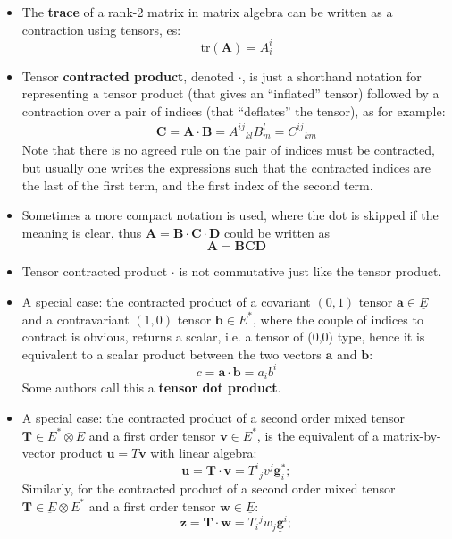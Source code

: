 \documentclass{digitaldynamics}
\def\vect#1{\bm{#1}}
\def\vcovar#1{{\bm{#1}}^*}
\def\vcontr#1{\underline{\bm{#1}}}
\def\tensor#1{\bm{#1}}
\def\matr#1{{#1}}
\begin{document}
\begin{itemize}
	\item The \textbf{trace} of a rank-2 matrix in matrix algebra can be written as a contraction using tensors, es:
	\[ 
		\mathrm{tr}(\tensor{A}) = A^i_i
	\]
	
	
	\item Tensor \textbf{contracted product}, denoted $\cdot$, is just a shorthand notation for representing a tensor product (that gives an "`inflated"' tensor) followed by a contraction over a pair of indices (that "`deflates"' the tensor), as for example:
	\begin{align}
	 \tensor{C} = \tensor{A} \cdot \tensor{B} = A^{ij}{}_{kl} B^{l}_{m} = C^{ij}{}_{km}
	\label{eq:tensorcontractedproduct}
	\end{align}
	Note that there is no agreed rule on the pair of indices must be contracted, but usually one writes the expressions such that the contracted indices are the last of the first term, and the first index of the second term.
	
	\item Sometimes a more compact notation is used, where the dot is skipped if the meaning is clear, thus $\tensor{A} = \tensor{B} \cdot \tensor{C} \cdot \tensor{D}$ could be written as 
	\[
	\tensor{A} = \tensor{B} \tensor{C} \tensor{D}
	\]
	
	\item Tensor contracted product $\cdot$ is not commutative just like the tensor product.
	
	\item A special case: the contracted product of a covariant $(0,1)$ tensor $\tensor{a} \in \underline{E}$ and a contravariant $(1,0)$ tensor $\vect{b} \in E^*$, where the couple of indices to contract is obvious, returns a scalar, i.e. a tensor of (0,0) type, hence it is equivalent to a scalar product between the two vectors $\vect{a}$ and $\vect{b}$:
	\[
	c = \vect{a} \cdot \vect{b} = a_i b^i
	\]
	Some authors call this a \textbf{tensor dot product}.
	
	\item A special case: the contracted product of a second order mixed tensor $\tensor{T} \in E^* \otimes \underline{E}$ and a first order tensor $\tensor{v} \in E^*$, is the equivalent of a matrix-by-vector product $\vect{u}=\matr{T}\vect{v}$ with linear algebra:
	\[
	\tensor{u} = \tensor{T} \cdot \vect{v} = T^i{}_j v^j \vcovar{g}_i;
	\]
	Similarly, for the contracted product of a second order mixed tensor $\tensor{T} \in \underbar{E} \otimes E^*$ and a first order tensor $\tensor{w} \in \underline{E}$:
	\[
	\tensor{z} = \tensor{T} \cdot \vect{w} = T_i{}^j w_j \vcontr{g}^i;
	\]
	

\end{itemize}
\end{document}
